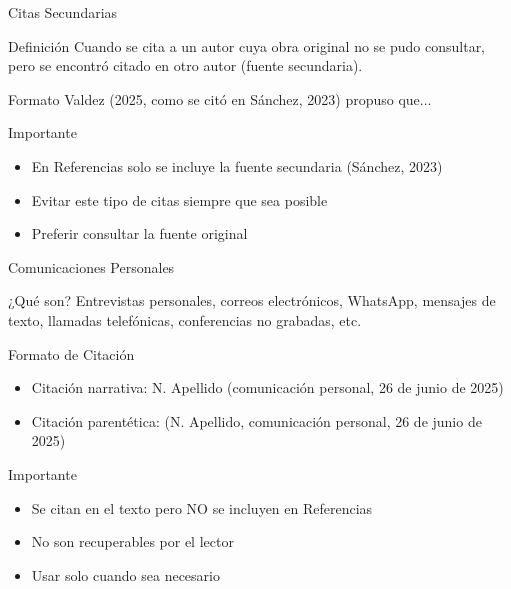 \documentclass[spanish,aspectratio=169]{beamer}
\begin{document}
\begin{frame}{Citas Secundarias}
	\begin{block}{Definición}
		Cuando se cita a un autor cuya obra original no se pudo consultar, pero se encontró citado en otro autor (fuente secundaria).
	\end{block}
	
	\begin{exampleblock}{Formato}
		\small
		Valdez (2025, como se citó en Sánchez, 2023) propuso que...
	\end{exampleblock}
	
	\begin{alertblock}{Importante}
		\begin{itemize}
			\item En Referencias solo se incluye la fuente secundaria (Sánchez, 2023)
			\item Evitar este tipo de citas siempre que sea posible
			\item Preferir consultar la fuente original
		\end{itemize}
	\end{alertblock}
\end{frame}

\begin{frame}{Comunicaciones Personales}
	\begin{block}{¿Qué son?}
		Entrevistas personales, correos electrónicos, WhatsApp, mensajes de texto, llamadas telefónicas, conferencias no grabadas, etc.
	\end{block}
	
	\begin{exampleblock}{Formato de Citación}
		\small
		\begin{itemize}
			\item Citación narrativa: N. Apellido (comunicación personal, 26 de junio de 2025)
			\item Citación parentética: (N. Apellido, comunicación personal, 26 de junio de 2025)
		\end{itemize}
	\end{exampleblock}
	
	\begin{alertblock}{Importante}
		\begin{itemize}
			\item Se citan en el texto pero \alert{NO} se incluyen en Referencias
			\item No son recuperables por el lector
			\item Usar solo cuando sea necesario
		\end{itemize}
	\end{alertblock}
\end{frame}
\end{document}
